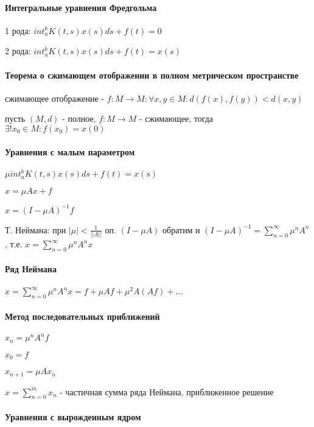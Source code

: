 \documentclass[russian,twocolumn]{article}
\begin{document}
\paragraph{Интегральные уравнения Фредгольма}

1 рода: $int_a^b K(t,s)x(s) ds + f(t) = 0$

2 рода: $int_a^b K(t,s)x(s) ds + f(t) = x(s)$

\paragraph{Теорема о сжимающем отображении в полном метрическом пространстве}

сжимающее отображение - $f:M \to M:\forall x,y \in M : d(f(x), f(y)) < d(x, y)$

пусть $(M,d)$ - полное, $f:M \to M$ - сжимающее, тогда $\exists ! x_0 \in M : f(x_0) = x(0)$

\paragraph{Уравнения с малым параметром}

$\mu int_a^b K(t,s)x(s) ds + f(t) = x(s)$

$x= \mu A x + f$

$x = (I - \mu A)^{-1} f$

Т. Неймана: при $|\mu| < \frac{1}{||A||}$ оп. $(I - \mu A)$ обратим и $(I - \mu A)^{-1} = \sum_{n=0}^{\infty} \mu^n A^n$, т.е. $x = \sum_{n=0}^{\infty} \mu^n A^n x$

\paragraph{Ряд Неймана}

$x = \sum_{n=0}^{\infty} \mu^n A^n x = f + \mu A f + \mu ^ 2 A(Af) + ...$

\paragraph{Метод последовательных приближений}

$x_n = \mu^n A^n f$

$x_0 = f$

$x_{n+1} = \mu A x_n$

$x = \sum_{n=0}^m x_n$ - частичная сумма ряда Неймана, приближенное решение

\paragraph{Уравнения с вырожденным ядром}
\end{document}
